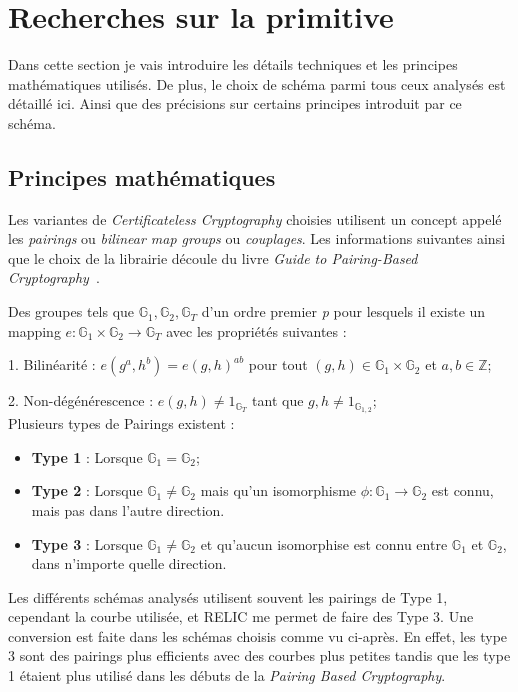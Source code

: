 \section{Recherches sur la primitive}
\label{sec:primitiveSearch}
Dans cette section je vais introduire les détails techniques et les principes mathématiques utilisés. De plus, le choix de schéma parmi tous ceux analysés est détaillé ici. Ainsi que des précisions sur certains principes introduit par ce schéma.
\subsection{Principes mathématiques}
\label{subsec:mathPairings}
Les variantes de \textit{Certificateless Cryptography} choisies utilisent un concept appelé les \textit{pairings} ou \textit{bilinear map groups} ou \textit{couplages}. Les informations suivantes ainsi que le choix de la librairie découle du livre \textit{Guide to Pairing-Based Cryptography}~\cite{bookPairing}.

Des groupes tels que $\mathbb{G}_1, \mathbb{G}_2, \mathbb{G}_T$ d'un ordre premier \textit{p} pour lesquels il existe un mapping $e : \mathbb{G}_1 \times \mathbb{G}_2 \rightarrow \mathbb{G}_T$ avec les propriétés suivantes :

1. Bilinéarité : $e(g^a, h^b) = e(g, h)^{ab}$ pour tout $(g,h) \in \mathbb{G}_1 \times \mathbb{G}_2$ et $a,b \in \mathbb{Z}$;

2. Non-dégénérescence : $e(g,h) \neq 1_{\mathbb{G}_T} $ tant que $g,h \neq 1_{\mathbb{G}_{1,2}}$;\\
Plusieurs types de Pairings existent :

\begin{itemize}
	\item \textbf{Type 1} : Lorsque $\mathbb{G}_1 = \mathbb{G}_2$;
	\item \textbf{Type 2} : Lorsque $\mathbb{G}_1 \ne \mathbb{G}_2$ mais qu'un isomorphisme $\phi : \mathbb{G}_1 \rightarrow \mathbb{G}_2$ est connu, mais pas dans l'autre direction.
	\item \textbf{Type 3} : Lorsque $\mathbb{G}_1 \ne \mathbb{G}_2$ et qu'aucun isomorphise est connu entre $\mathbb{G}_1$ et $\mathbb{G}_2$, dans n'importe quelle direction.
\end{itemize}
Les différents schémas analysés utilisent souvent les pairings de Type 1, cependant la courbe utilisée, et RELIC me permet de faire des Type 3. Une conversion est faite dans les schémas choisis comme vu ci-après. En effet, les type 3 sont des pairings plus efficients avec des courbes plus petites tandis que les type 1 étaient plus utilisé dans les débuts de la \textit{Pairing Based Cryptography}.
